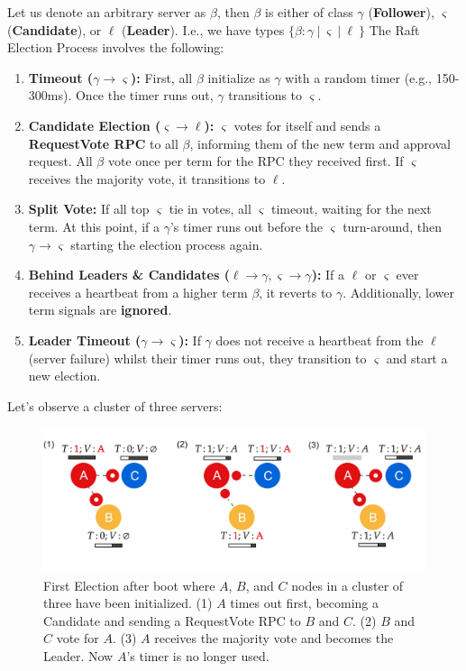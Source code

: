 \begin{Def}

    Let us denote an arbitrary server as $\beta$, then $\beta$ is either of class $\gamma$ (\textbf{Follower}), $\varsigma$ (\textbf{Candidate}), or $\ell$ (\textbf{Leader}). 
    I.e., we have types $\{\beta: \gamma\ |\ \varsigma\ |\ \ell\ \}$ The Raft Election Process involves the following:
    \begin{enumerate}
        \item \textbf{Timeout ($\gamma\to\varsigma$):} First, all $\beta$ initialize as $\gamma$ with a random timer (e.g., 150-300ms). 
        Once the timer runs out, $\gamma$ transitions to $\varsigma$.
        \item \textbf{Candidate Election ($\varsigma\to\ell$):} $\varsigma$ votes for itself and sends a \textbf{RequestVote RPC} to all $\beta$, informing them of the new term and approval request.
        All $\beta$ vote once per term for the RPC they received first. If $\varsigma$ receives the majority vote, it transitions to $\ell$.
        \item \textbf{Split Vote:} If all top $\varsigma$ tie in votes, all $\varsigma$ timeout, waiting for the next term. At this point, if a $\gamma$'s timer runs out before the $\varsigma$ turn-around, then $\gamma\to\varsigma$ starting the election process again.
        \item \textbf{Behind Leaders \& Candidates ($\ell\to\gamma,\varsigma\to\gamma$):} If a $\ell$ or $\varsigma$ ever receives a heartbeat from a higher term $\beta$, it reverts to $\gamma$. Additionally, 
        lower term signals are \textbf{ignored}.
        \item \textbf{Leader Timeout ($\gamma\to\varsigma$):} If $\gamma$ does not receive a heartbeat from the $\ell$ (server failure) whilst their timer runs out, they transition to $\varsigma$ and start a new election.
    \end{enumerate}
\end{Def}

\noindent
Let's observe a cluster of three servers:
\begin{figure}[h]
    \centering
    \includegraphics[width=\textwidth]{Sections/raft/election.png}
    \caption{First Election after boot where $A$, $B$, and $C$ nodes in a cluster of three have been initialized. 
    (1) $A$ times out first, becoming a Candidate and sending a RequestVote RPC to $B$ and $C$. (2) $B$ and $C$ vote for $A$.
    (3) $A$ receives the majority vote and becomes the Leader. Now $A$'s timer is no longer used.}
\end{figure}

